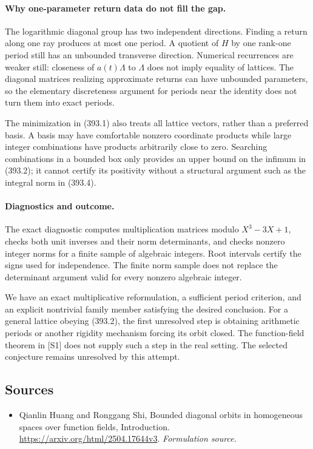 \documentclass[11pt]{article}
\begin{document}
\paragraph{Why one-parameter return data do not fill the gap.}
The logarithmic diagonal group has two independent directions.
Finding a return along one ray produces at most one period. A
quotient of $H$ by one rank-one period still has an unbounded
transverse direction. Numerical recurrences are weaker still: closeness
of $a(t)\Lambda$ to $\Lambda$ does not imply equality of lattices.
The diagonal matrices realizing approximate returns can have unbounded
parameters, so the elementary discreteness argument for periods near
the identity does not turn them into exact periods.

The minimization in (393.1) also treats all lattice vectors, rather
than a preferred basis. A basis may have comfortable nonzero
coordinate products while large integer combinations have products
arbitrarily close to zero. Searching combinations in a bounded box
only provides an upper bound on the infimum in (393.2); it cannot
certify its positivity without a structural argument such as the
integral norm in (393.4).

\paragraph{Diagnostics and outcome.}
The exact diagnostic computes multiplication matrices modulo
$X^3-3X+1$, checks both unit inverses and their norm determinants,
and checks nonzero integer norms for a finite sample of algebraic
integers. Root intervals certify the signs used for independence.
The finite norm sample does not replace the determinant argument
valid for every nonzero algebraic integer.

We have an exact multiplicative reformulation, a sufficient period
criterion, and an explicit nontrivial family member satisfying the
desired conclusion. For a general lattice obeying (393.2), the first
unresolved step is obtaining arithmetic periods or another rigidity
mechanism forcing its orbit closed. The function-field theorem in
[S1] does not supply such a step in the real setting. The selected
conjecture remains unresolved by this attempt.
\subsection{Sources}
\begin{itemize}
\item[S1]Qianlin Huang and Ronggang Shi, Bounded diagonal orbits in homogeneous spaces over function fields, Introduction.
\url{https://arxiv.org/html/2504.17644v3}.
\textit{Formulation source.}
\end{itemize}
\end{document}
